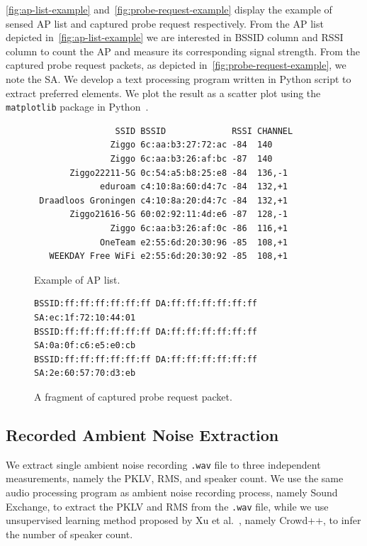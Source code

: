 \autoref{fig:ap-list-example} and~\autoref{fig:probe-request-example} display the example of sensed \ac{AP} list and captured probe request respectively. From the \ac{AP} list depicted in~\autoref{fig:ap-list-example} we are interested in \ac{BSSID} column and \ac{RSSI} column to count the \ac{AP} and measure its corresponding signal strength. From the captured probe request packets, as depicted in~\autoref{fig:probe-request-example}, we note the \ac{SA}. We develop a text processing program written in Python script to extract preferred elements. We plot the result as a scatter plot using the \verb|matplotlib| package in Python~\cite{Hunter:2007}.

\begin{figure}[ht]
	\centering
\begin{verbatim}
                SSID BSSID             RSSI CHANNEL 
               Ziggo 6c:aa:b3:27:72:ac -84  140     
               Ziggo 6c:aa:b3:26:af:bc -87  140     
       Ziggo22211-5G 0c:54:a5:b8:25:e8 -84  136,-1  
             eduroam c4:10:8a:60:d4:7c -84  132,+1  
 Draadloos Groningen c4:10:8a:20:d4:7c -84  132,+1  
       Ziggo21616-5G 60:02:92:11:4d:e6 -87  128,-1  
               Ziggo 6c:aa:b3:26:af:0c -86  116,+1  
             OneTeam e2:55:6d:20:30:96 -85  108,+1  
   WEEKDAY Free WiFi e2:55:6d:20:30:92 -85  108,+1  
\end{verbatim}
	\caption{Example of \ac{AP} list.}
	\label{fig:ap-list-example}
\end{figure}

\begin{figure}[ht]
\centering
\begin{verbatim}
BSSID:ff:ff:ff:ff:ff:ff DA:ff:ff:ff:ff:ff:ff SA:ec:1f:72:10:44:01
BSSID:ff:ff:ff:ff:ff:ff DA:ff:ff:ff:ff:ff:ff SA:0a:0f:c6:e5:e0:cb
BSSID:ff:ff:ff:ff:ff:ff DA:ff:ff:ff:ff:ff:ff SA:2e:60:57:70:d3:eb
\end{verbatim}
\caption{A fragment of captured probe request packet.}
\label{fig:probe-request-example}
\end{figure}

\subsection{Recorded Ambient Noise Extraction} %
\label{sub:recorded_ambient_noise_extraction}
We extract single ambient noise recording \verb|.wav| file to three independent measurements, namely the \ac{PKLV}, \ac{RMS}, and speaker count. We use the same audio processing program as ambient noise recording process, namely Sound Exchange, to extract the \ac{PKLV} and \ac{RMS} from the \verb|.wav| file, while we use unsupervised learning method proposed by Xu et al.~\cite{thesis067}, namely Crowd++, to infer the number of speaker count.

